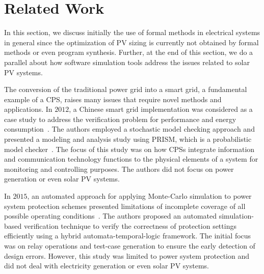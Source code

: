  
\section{Related Work}

In this section, we discuss initially the use of formal methods in electrical systems in general since the optimization of PV sizing is currently not obtained by formal methods or even program synthesis. Further, at the end of this section, we do a parallel about how software simulation tools address the issues related to solar PV systems.%

The conversion of the traditional power grid into a smart grid, a fundamental example of a CPS, raises many issues that require novel methods and applications. In $2012$, a Chinese smart grid implementation was considered as a case study to address the verification problem for performance and energy consumption~\cite{Yukseletall2012}. The authors employed a stochastic model checking approach and presented a modeling and analysis study using PRISM, which is a probabilistic model checker~\cite{KwiatkowskaNP11}. The focus of this study was on how CPSs integrate information and communication technology functions to the physical elements of a system for monitoring and controlling purposes. The authors did not focus on power generation or even solar PV systems.

In $2015$, an automated approach for applying Monte-Carlo simulation to power system protection schemes presented limitations of incomplete coverage of all possible operating conditions~\cite{Sengupta2015}. The authors proposed an automated simulation-based verification technique to verify the correctness of protection settings efficiently using a hybrid automata-temporal-logic framework. The initial focus was on relay operations and test-case generation to ensure the early detection of design errors. However, this study was limited to power system protection and did not deal with electricity generation or even solar PV systems.

